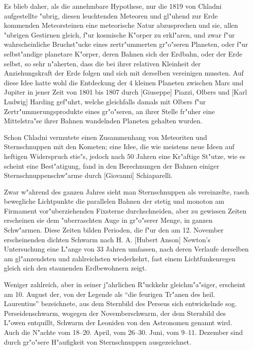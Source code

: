 \documentclass[a4paper, 11pt, oneside]{article}
\begin{document}
Es blieb daher, als die annehmbare Hypothese, nur die 1819 von Chladni aufgestellte "ubrig, diesen leuchtenden Meteoren und gl"uhend zur Erde kommenden Meteorsteinen eine meteorische Natur abzusprechen und sie, allen "ubrigen Gestirnen gleich, f"ur kosmische K"orper zu erkl"aren, und zwar f"ur wahrscheinliche Bruchst"ucke eines zertr"ummerten gr"o"seren Planeten, oder f"ur selbst"andige planetare K"orper, deren Bahnen sich der Erdbahn, oder der Erde selbst, so sehr n"aherten, dass die bei ihrer relativen Kleinheit der Anziehungskraft der Erde folgen und sich mit derselben vereinigen mussten. Auf diese Idee hatte wohl die Entdeckung der 4 kleinen Planeten zwischen Mars und Jupiter in jener Zeit von 1801 bis 1807 durch [Giuseppe] Piazzi, Olbers und [Karl Ludwig] Harding gef"uhrt, welche gleichfalls damals mit Olbers f"ur Zertr"ummerungsprodukte eines gr"o"seren, an ihrer Stelle fr"uher eine Mittelstra"se ihrer Bahnen wandelnden Planeten gehalten wurden.

Schon Chladni vermutete einen Zusammenhang von Meteoriten und Sternschnuppen mit den Kometen; eine Idee, die wie meistens neue Ideen auf heftigen Widerspruch stie"s, jedoch nach 50 Jahren eine Kr"aftige St"utze, wie es scheint eine Best"atigung, fand in den Berechnungen der Bahnen einiger Sternschnuppenschw"arme durch [Giovanni] Schiaparelli.

Zwar w"ahrend des ganzen Jahres sieht man Sternschnuppen als vereinzelte, rasch bewegliche Lichtpunkte die parallelen Bahnen der stetig und monoton am Firmament vor"uberziehenden Fixsterne durchschneiden, aber zu gewissen Zeiten erscheinen sie dem "uberraschten Auge in gr"o"serer Menge, in ganzen Schw"armen. Diese Zeiten bilden Perioden, die f"ur den am 12. November erscheinenden dichten Schwarm nach H. A. [Hubert Anson] Newton's Untersuchung eine L"ange von 33 Jahren umfassen, nach deren Verlaufe derselben am gl"anzendsten und zahlreichsten wiederkehrt, fast einem Lichtfunkenregen gleich sich den staunenden Erdbewohnern zeigt.

Weniger zahlreich, aber in seiner j"ahrlichen R"uckkehr gleichm"a"siger, erscheint am 10. August der, von der Legende als "`die feurigen Tr"anen des heil. Laurentius"' bezeichnete, aus dem Sternbild des Perseus sich entwickelnde sog. Perseidenschwarm, wogegen der Novemberschwarm, der dem Sternbild des L"owen entquillt, Schwarm der Leoniden von den Astronomen genannt wird. Auch die N"achte vom 18--20. April, vom 26--30. Juni, vom 9--11. Dezember sind durch gr"o"sere H"aufigkeit von Sternschnuppen ausgezeichnet.
\end{document}
